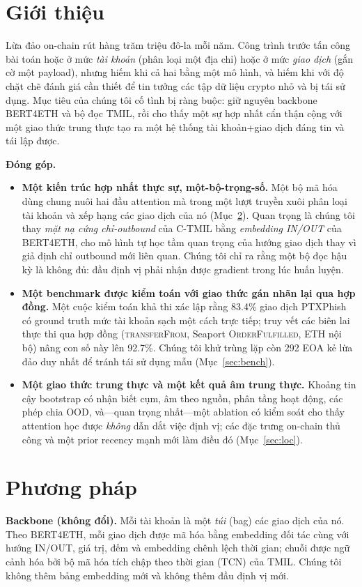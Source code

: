 \documentclass[conference]{IEEEtran}
\begin{document}
\section{Giới thiệu}
Lừa đảo on-chain rút hàng trăm triệu đô-la mỗi năm. Công trình trước tấn công bài
toán hoặc ở mức \emph{tài khoản} (phân loại một địa chỉ) hoặc ở mức \emph{giao
dịch} (gắn cờ một payload), nhưng hiếm khi cả hai bằng một mô hình, và hiếm khi với
độ chặt chẽ đánh giá cần thiết để tin tưởng các tập dữ liệu crypto nhỏ và bị tái
sử dụng. Mục tiêu của chúng tôi cố tình bị ràng buộc: giữ nguyên backbone BERT4ETH
và bộ đọc TMIL, rồi cho thấy một sự hợp nhất cẩn thận cộng với một giao thức trung
thực tạo ra một hệ thống tài khoản+giao dịch đáng tin và tái lập được.

\noindent\textbf{Đóng góp.}
\begin{itemize}
\item \textbf{Một kiến trúc hợp nhất thực sự, một-bộ-trọng-số.} Một bộ mã hóa dùng
chung nuôi hai đầu attention mà trong một lượt truyền xuôi phân loại tài khoản và
xếp hạng các giao dịch của nó (Mục~\ref{sec:method}). Quan trọng là chúng tôi thay
\emph{mặt nạ cứng chỉ-outbound} của C-TMIL bằng \emph{embedding IN/OUT} của
BERT4ETH, cho mô hình tự học tầm quan trọng của hướng giao dịch thay vì giả định
chỉ outbound mới liên quan. Chúng tôi chỉ ra rằng một bộ đọc hậu kỳ là không đủ:
đầu định vị phải nhận được gradient trong lúc huấn luyện.
\item \textbf{Một benchmark được kiểm toán với giao thức gán nhãn lại qua hợp đồng.}
Một cuộc kiểm toán khả thi xác lập rằng 83.4\% giao dịch PTXPhish có ground truth
mức tài khoản sạch một cách trực tiếp; truy vết các biên lai thực thi qua hợp đồng
(\textsc{transferFrom}, Seaport \textsc{OrderFulfilled}, ETH nội bộ) nâng con số
này lên 92.7\%. Chúng tôi khử trùng lặp còn 292 EOA kẻ lừa đảo duy nhất để tránh
tái sử dụng mẫu (Mục~\ref{sec:bench}).
\item \textbf{Một giao thức trung thực và một kết quả âm trung thực.} Khoảng tin cậy
bootstrap có nhận biết cụm, âm theo nguồn, phân tầng hoạt động, các phép chia OOD,
và---quan trọng nhất---một ablation có kiểm soát cho thấy attention học được
\emph{không} dẫn dắt việc định vị; các đặc trưng on-chain thủ công và một prior
recency mạnh mới làm điều đó (Mục~\ref{sec:loc}).
\end{itemize}

\section{Phương pháp}\label{sec:method}
\textbf{Backbone (không đổi).} Mỗi tài khoản là một \emph{túi} (bag) các giao dịch
của nó. Theo BERT4ETH, mỗi giao dịch được mã hóa bằng embedding đối tác cùng với
hướng IN/OUT, giá trị, đếm và embedding chênh lệch thời gian; chuỗi được ngữ cảnh
hóa bởi bộ mã hóa tích chập theo thời gian (TCN) của TMIL. Chúng tôi không thêm
bảng embedding mới và không thêm đầu định vị mới.
\end{document}

